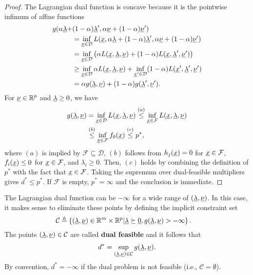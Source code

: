 \begin{proof}
The Lagrangian dual function is concave because it is the pointwise infimum of affine functions
\begin{align*}
g(\alpha\underline{\lambda}+&(1-\alpha)\underline{\lambda}',\alpha\underline{\nu}+(1-\alpha)\underline{\nu}') \\
&= \inf_{\underline{x}\in \mathcal{D}} L(\underline{x},\alpha\underline{\lambda}+(1-\alpha)\underline{\lambda}',\alpha\underline{\nu}+(1-\alpha) \underline{\nu}') \\
&= \inf_{\underline{x}\in \mathcal{D}} \big( \alpha L(\underline{x},\underline{\lambda},\underline{\nu}) + (1-\alpha) L(\underline{x},\underline{\lambda}',\underline{\nu}') \big) \\
&\geq \inf_{\underline{x}\in \mathcal{D}} \alpha L(\underline{x},\underline{\lambda},\underline{\nu}) + \inf_{\underline{x}'\in \mathcal{D}} (1-\alpha) L(\underline{x}',\underline{\lambda}',\underline{\nu}') \\
&= \alpha g(\underline{\lambda},\underline{\nu}) + (1-\alpha) g(\underline{\lambda}',\underline{\nu}').
\end{align*}
For $\underline \nu \in \mathbb{R}^p$ and $\underline\lambda\ge0$, we have
\begin{align*}
g(\vecnot{\lambda},\vecnot{\nu})
&= \inf_{\vecnot{x}\in \mathcal{D}} L(\vecnot{x},\vecnot{\lambda},\vecnot{\nu})
\stackrel{(a)}{\leq} \inf_{\vecnot{x}\in \mathcal{F}} L(\vecnot{x},\vecnot{\lambda},\vecnot{\nu}) \\
&\stackrel{(b)}{\leq}  \inf_{\vecnot{x}\in \mathcal{F}} f_0(\vecnot x ) %
\stackrel{(c)}{\leq} p^*,
\end{align*}
where $(a)$ is implied by $\mathcal{F} \subseteq \mathcal{D}$, $(b)$ follows from $h_j(\underline{x}) = 0$ for $\underline{x} \in \mathcal{F}$, $f_i(\underline{x}) \leq 0$ for $\underline{x}\in \mathcal{F}$, and $\lambda_i \geq 0$.
Then, $(c)$ holds by combining the definition of $p^*$ with the fact that $\underline{x}\in \mathcal{F}$.
Taking the supremum over dual-feasible multipliers gives $d^*\le p^*$.
If $\mathcal F$ is empty, $p^*=\infty$ and the conclusion is immediate.
\end{proof}

The Lagrangian dual function can be $-\infty$ for a wide range of $(\underline{\lambda},\underline{\nu})$.
In this case, it makes sense to eliminate these points by defining the implicit constraint set
\begin{align*}
\mathcal{C} &\triangleq \left\{ (\underline{\lambda},\underline{\nu}) \in \mathbb{R}^m \times \mathbb{R}^p | \underline{\lambda}\succeq \underline{0},  g(\underline{\lambda},\underline{\nu}) > -\infty \right\}.
\end{align*}
The points $(\underline{\lambda},\underline{\nu}) \in \mathcal{C}$ are called \textbf{dual feasible} and it follows that
\[ d^* = \sup_{(\underline{\lambda},\underline{\nu})\in \mathcal{C}} g(\underline{\lambda},\underline{\nu}). \]
By convention, $d^* = -\infty$ if the dual problem is not feasible (i.e., $\mathcal{C} = \emptyset$).

